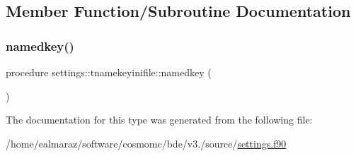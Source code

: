 \subsection{Member Function/\+Subroutine Documentation}
\mbox{\label{structsettings_1_1tnamekeyinifile_aa3c5b9d378e0890fe70b2950df3fc656}} 
\subsubsection{\texorpdfstring{namedkey()}{namedkey()}}
{\footnotesize\ttfamily procedure settings\+::tnamekeyinifile\+::namedkey (\begin{DoxyParamCaption}{ }\end{DoxyParamCaption})}



The documentation for this type was generated from the following file\+:\begin{DoxyCompactItemize}
\item 
/home/ealmaraz/software/cosmomc/bde/v3./source/\mbox{\hyperlink{settings_8f90}{settings.\+f90}}\end{DoxyCompactItemize}
